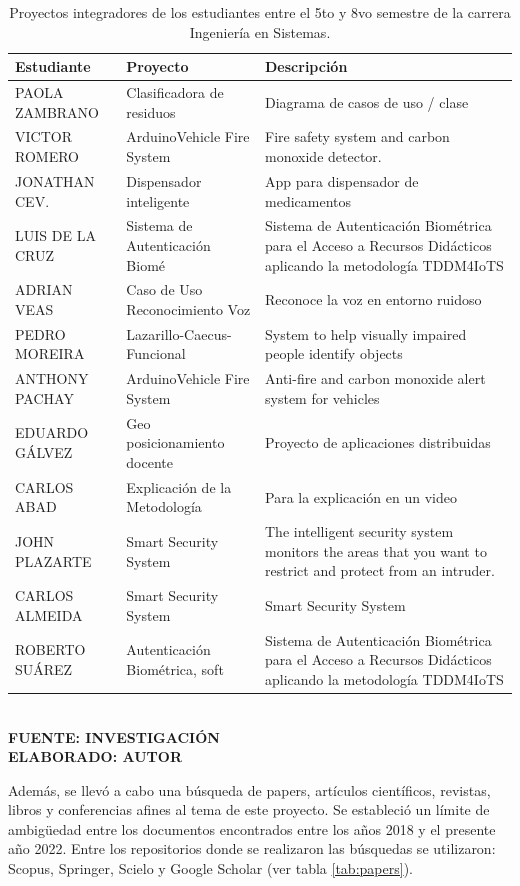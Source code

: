 \begin{table}[h!]
	\centering
	\caption{Proyectos integradores de los estudiantes entre el 5to y 8vo semestre de la carrera Ingeniería en Sistemas.}
	\label{tab:proeyctos_tdd}
	\begin{tabular}{p{4cm}p{4cm}p{6cm}}
		\hline
		\textbf{Estudiante} & \textbf{Proyecto} & \textbf{Descripción} \\
		\hline
		PAOLA ZAMBRANO & Clasificadora de residuos & Diagrama de casos de uso / clase \\
		VICTOR ROMERO & ArduinoVehicle Fire System & Fire safety system and carbon monoxide detector.\\
		JONATHAN CEV. & Dispensador inteligente & App para dispensador de medicamentos \\
		LUIS DE LA CRUZ & Sistema de Autenticación Biomé & Sistema de Autenticación Biométrica para el Acceso a Recursos Didácticos aplicando la metodología TDDM4IoTS \\
		ADRIAN VEAS & Caso de Uso Reconocimiento Voz & Reconoce la voz en entorno ruidoso \\
		PEDRO MOREIRA & Lazarillo-Caecus-Funcional & System to help visually impaired people identify objects \\
		ANTHONY PACHAY & ArduinoVehicle Fire System & Anti-fire and carbon monoxide alert system for vehicles \\ 
		EDUARDO GÁLVEZ & Geo posicionamiento docente & Proyecto de aplicaciones distribuidas \\
		CARLOS ABAD & Explicación de la Metodología & Para la explicación en un video \\
		JOHN PLAZARTE & Smart Security System & The intelligent security system monitors the areas that you want to restrict and protect from an intruder. \\
		CARLOS ALMEIDA & Smart Security System & Smart Security System\\
		ROBERTO SUÁREZ & Autenticación Biométrica, soft & Sistema de Autenticación Biométrica para el Acceso a Recursos Didácticos aplicando la metodología TDDM4IoTS \\
		\hline
	\end{tabular}
\vspace{4mm}
{\footnotesize \textbf{\\ FUENTE: INVESTIGACIÓN \\ ELABORADO: AUTOR}}
\end{table}

Además, se llevó a cabo una búsqueda de papers, artículos científicos, revistas, libros y conferencias afines al tema de este proyecto. Se estableció un límite de ambigüedad entre los documentos encontrados entre los años 2018 y el presente año 2022. Entre los repositorios donde se realizaron las búsquedas se utilizaron: Scopus, Springer, Scielo y Google Scholar (ver tabla \ref{tab:papers}). 

